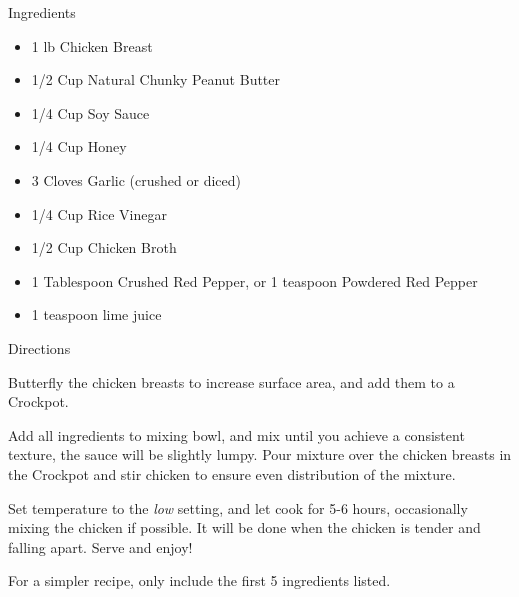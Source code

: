 Ingredients
\begin{itemize}
	\item 1 lb Chicken Breast
	\item 1/2 Cup Natural Chunky Peanut Butter
	\item 1/4 Cup Soy Sauce
	\item 1/4 Cup Honey
	\item 3 Cloves Garlic (crushed or diced)
	\item 1/4 Cup Rice Vinegar
	\item 1/2 Cup Chicken Broth
	\item 1 Tablespoon Crushed Red Pepper, or 1 teaspoon Powdered Red Pepper
	\item 1 teaspoon lime juice
\end{itemize}

\noindent
Directions
\newline

Butterfly the chicken breasts to increase surface area, and add them to a Crockpot.

Add all ingredients to mixing bowl, and mix until you achieve a consistent texture, the sauce will be slightly lumpy. Pour mixture over the chicken breasts in the Crockpot and stir chicken to ensure even distribution of the mixture.

Set temperature to the \textit{low} setting, and let cook for 5-6 hours, occasionally mixing the chicken if possible. It will be done when the chicken is tender and falling apart. Serve and enjoy!

For a simpler recipe, only include the first 5 ingredients listed.